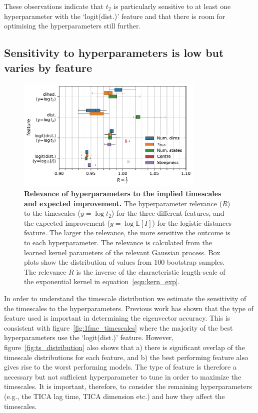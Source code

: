 \documentclass[journal=jacsat,manuscript=article]{achemso}
\begin{document}
These observations indicate that $t_2$ is particularly sensitive to at least one hyperparameter with the `logit(dist.)' feature and that there is room for optimising the hyperparameters still further. 

\subsection{Sensitivity to hyperparameters is low but varies by feature}\label{sec:sensitivity}

\begin{figure}
    \centering
    \includegraphics[width=0.8\textwidth]{figures/sensitivity.pdf}
    \caption{\textbf{Relevance of hyperparameters to the implied timescales and expected improvement.} The hyperparameter relevance ($R$) to the timescales ($y=\log{t_{2}}$) for the three different features,  and the expected improvement ($y=\log{\mathbb{E}[I]}$) for the logistic-distances feature. The larger the relevance, the more sensitive the outcome is to each hyperparameter.  The relevance is calculated from the learned kernel parameters of the relevant Gaussian process. Box plots show the distribution of values from \num{100} bootstrap samples. The relevance $R$ is the inverse of the characteristic length-scale of the exponential kernel in equation~\ref{eqn:kern_exp}. }
    \label{fig:sensitivity}
\end{figure}

In order to understand the timescale distribution we estimate the sensitivity of the timescales to the hyperparameters. Previous work has shown that the type of feature used is important in determining the eigenvector accuracy. This is consistent with figure~\ref{fig:1fme_timescales}  where the majority of the best hyperparameters use the `logit(dist.)' feature.  However, figure~\ref{fig:ts_distribution} also shows that a) there is significant overlap of the timescale distributions for each feature, and b) the best performing feature also gives rise to the worst performing models. The type of feature is therefore a necessary but not sufficient hyperparameter to tune in order to maximize the timescales. It is important, therefore, to consider the remaining hyperparameters (e.g., the TICA lag time, TICA dimension etc.) and how they affect the timescales.  
\end{document}
